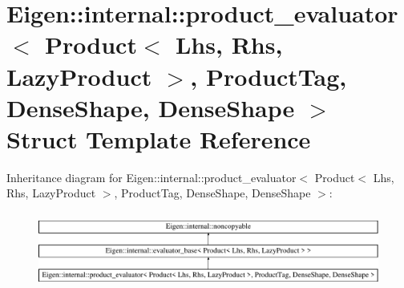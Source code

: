 \hypertarget{struct_eigen_1_1internal_1_1product__evaluator_3_01_product_3_01_lhs_00_01_rhs_00_01_lazy_produc1ed1c0c8715953d10d735722e273406b}{}\section{Eigen\+::internal\+::product\+\_\+evaluator$<$ Product$<$ Lhs, Rhs, Lazy\+Product $>$, Product\+Tag, Dense\+Shape, Dense\+Shape $>$ Struct Template Reference}
\label{struct_eigen_1_1internal_1_1product__evaluator_3_01_product_3_01_lhs_00_01_rhs_00_01_lazy_produc1ed1c0c8715953d10d735722e273406b}
Inheritance diagram for Eigen\+::internal\+::product\+\_\+evaluator$<$ Product$<$ Lhs, Rhs, Lazy\+Product $>$, Product\+Tag, Dense\+Shape, Dense\+Shape $>$\+:\begin{figure}[H]
\begin{center}
\leavevmode
\includegraphics[height=2.518741cm]{struct_eigen_1_1internal_1_1product__evaluator_3_01_product_3_01_lhs_00_01_rhs_00_01_lazy_produc1ed1c0c8715953d10d735722e273406b}
\end{center}
\end{figure}
